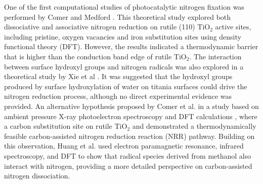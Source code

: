 One of the first computational studies of photocatalytic nitrogen fixation was performed by Comer and Medford \cite{Comer_sustainable}. This theoretical study explored both dissociative and associative nitrogen reduction on rutile (110) TiO$_2$ active sites, including pristine, oxygen vacancies and iron substitution sites using density functional theory (DFT). However, the results indicated a thermodynamic barrier that is higher than the conduction band edge of rutile TiO$_2$. The interaction between surface hydroxyl groups and nitrogen radicals was also explored in a theoretical study by Xie et al \cite{Xie_2019}. It was suggested that the hydroxyl groups produced by surface hydroxylation of water \cite{edwards1992opinion, Schaub_2001, Henderson1996, Krischok_2001, Ketteler_2007} on titania surfaces could drive the nitrogen reduction process, although no direct experimental evidence was provided. An alternative hypothesis proposed by Comer et al. in a study based on ambient pressure X-ray photoelectron spectroscopy and DFT calculations \cite{Comer2018}, where a carbon substitution site on rutile TiO$_2$ and demonstrated a thermodynamically feasible carbon-assisted nitrogen reduction reaction (NRR) pathway. %
Building on this observation, Huang et al. \cite{Huang2023FormationIllumination} used electron paramagnetic resonance, infrared spectroscopy, and DFT to show that radical species derived from methanol also interact with nitrogen, providing a more detailed perspective on carbon-assisted nitrogen dissociation.


